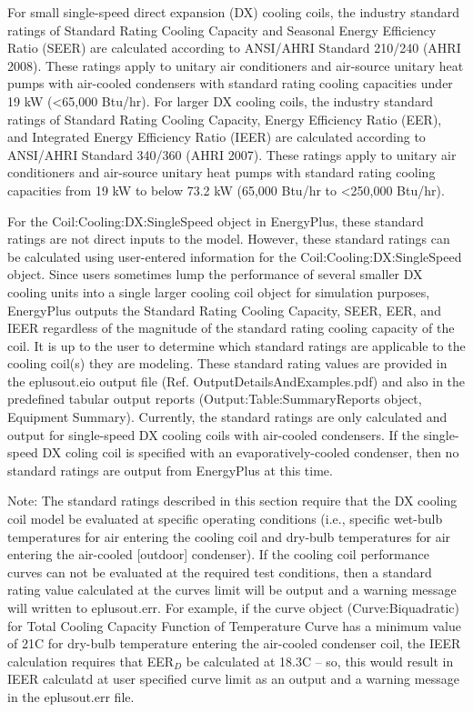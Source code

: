 For small single-speed direct expansion (DX) cooling coils, the industry standard ratings of Standard Rating Cooling Capacity and Seasonal Energy Efficiency Ratio (SEER) are calculated according to ANSI/AHRI Standard 210/240 (AHRI 2008). These ratings apply to unitary air conditioners and air-source unitary heat pumps with air-cooled condensers with standard rating cooling capacities under 19 kW (\textless{}65,000 Btu/hr). For larger DX cooling coils, the industry standard ratings of Standard Rating Cooling Capacity, Energy Efficiency Ratio (EER), and Integrated Energy Efficiency Ratio (IEER) are calculated according to ANSI/AHRI Standard 340/360 (AHRI 2007). These ratings apply to unitary air conditioners and air-source unitary heat pumps with standard rating cooling capacities from 19 kW to below 73.2 kW (65,000 Btu/hr to \textless{}250,000 Btu/hr).

For the Coil:Cooling:DX:SingleSpeed object in EnergyPlus, these standard ratings are not direct inputs to the model. However, these standard ratings can be calculated using user-entered information for the Coil:Cooling:DX:SingleSpeed object. Since users sometimes lump the performance of several smaller DX cooling units into a single larger cooling coil object for simulation purposes, EnergyPlus outputs the Standard Rating Cooling Capacity, SEER, EER, and IEER regardless of the magnitude of the standard rating cooling capacity of the coil. It is up to the user to determine which standard ratings are applicable to the cooling coil(s) they are modeling. These standard rating values are provided in the eplusout.eio output file (Ref. OutputDetailsAndExamples.pdf) and also in the predefined tabular output reports (Output:Table:SummaryReports object, Equipment Summary). Currently, the standard ratings are only calculated and output for single-speed DX cooling coils with air-cooled condensers. If the single-speed DX coling coil is specified with an evaporatively-cooled condenser, then no standard ratings are output from EnergyPlus at this time.

Note: The standard ratings described in this section require that the DX cooling coil model be evaluated at specific operating conditions (i.e., specific wet-bulb temperatures for air entering the cooling coil and dry-bulb temperatures for air entering the air-cooled {[}outdoor{]} condenser). If the cooling coil performance curves can not be evaluated at the required test conditions, then a standard rating value calculated at the curves limit will be output and a warning message will written to eplusout.err. For example, if the curve object (Curve:Biquadratic) for Total Cooling Capacity Function of Temperature Curve has a minimum value of 21C for dry-bulb temperature entering the air-cooled condenser coil, the IEER calculation requires that EER\(_{D}\) be calculated at 18.3C -- so, this would result in IEER calculatd at user specified curve limit as an output and a warning message in the eplusout.err file.

